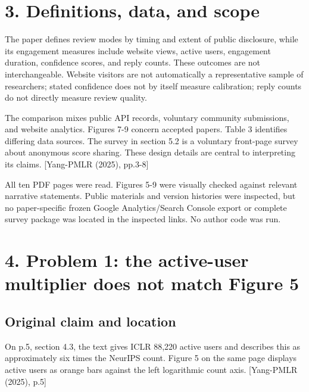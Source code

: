 \documentclass[10pt]{article}
\begin{document}
\section*{3. Definitions, data, and scope}
The paper defines review modes by timing and extent of public disclosure, while its engagement measures include website views, active users, engagement duration, confidence scores, and reply counts. These outcomes are not interchangeable. Website visitors are not automatically a representative sample of researchers; stated confidence does not by itself measure calibration; reply counts do not directly measure review quality.\par
The comparison mixes public API records, voluntary community submissions, and website analytics. Figures 7-9 concern accepted papers. Table 3 identifies differing data sources. The survey in section 5.2 is a voluntary front-page survey about anonymous score sharing. These design details are central to interpreting its claims. [Yang-PMLR (2025), pp.3-8]\par
All ten PDF pages were read. Figures 5-9 were visually checked against relevant narrative statements. Public materials and version histories were inspected, but no paper-specific frozen Google Analytics/Search Console export or complete survey package was located in the inspected links. No author code was run.\par
\section*{4. Problem 1: the active-user multiplier does not match Figure 5}
\subsection*{Original claim and location}
On p.5, section 4.3, the text gives ICLR 88,220 active users and describes this as approximately six times the NeurIPS count. Figure 5 on the same page displays active users as orange bars against the left logarithmic count axis. [Yang-PMLR (2025), p.5]\par
\end{document}
